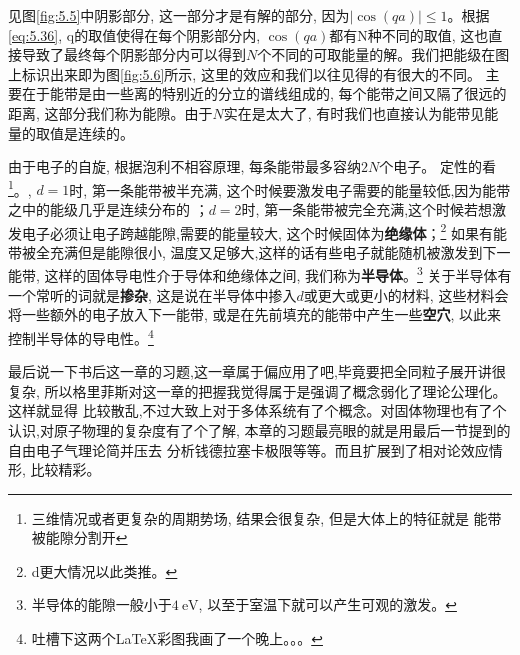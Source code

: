 见图\ref{fig:5.5}中阴影部分, 这一部分才是有解的部分, 因为$|\cos(qa)|\leq 1$。根据\ref{eq:5.36}, q的取值使得在每个阴影部分内, $\cos(qa)$都有N种不同的取值, 
这也直接导致了最终每个阴影部分内可以得到$N$个不同的可取能量的解。我们把能级在图上标识出来即为图\ref{fig:5.6}所示, 这里的效应和我们以往见得的有很大的不同。
主要在于能带是由一些离的特别近的分立的谱线组成的, 每个能带之间又隔了很远的距离, 这部分我们称为能隙。由于$N$实在是太大了, 有时我们也直接认为能带见能量的取值是连续的。

由于电子的自旋, 根据泡利不相容原理, 每条能带最多容纳$2N$个电子。 定性的看\footnote{三维情况或者更复杂的周期势场, 结果会很复杂, 但是大体上的特征就是
能带被能隙分割开}。, $d=1$时, 第一条能带被半充满, 这个时候要激发电子需要的能量较低,因为能带之中的能级几乎是连续分布的 ；$d=2$时, 第一条能带被完全充满,这个时候若想激发电子必须让电子跨越能隙,需要的能量较大, 这个时候固体为\textbf{绝缘体}；\footnote{d更大情况以此类推。}
如果有能带被全充满但是能隙很小, 温度又足够大,这样的话有些电子就能随机被激发到下一能带, 这样的固体导电性介于导体和绝缘体之间, 我们称为\textbf{半导体}。\footnote{半导体的能隙一般小于$\SI{4}{\eV}$, 以至于室温下就可以产生可观的激发。}
关于半导体有一个常听的词就是\textbf{掺杂}, 这是说在半导体中掺入$d$或更大或更小的材料, 这些材料会将一些额外的电子放入下一能带, 或是在先前填充的能带中产生一些\textbf{空穴}, 
以此来控制半导体的导电性。\footnote{吐槽下这两个\LaTeX 彩图我画了一个晚上。。。}

最后说一下书后这一章的习题,这一章属于偏应用了吧,毕竟要把全同粒子展开讲很复杂, 所以格里菲斯对这一章的把握我觉得属于是强调了概念弱化了理论公理化。这样就显得
比较散乱,不过大致上对于多体系统有了个概念。对固体物理也有了个认识,对原子物理的复杂度有了个了解, 本章的习题最亮眼的就是用最后一节提到的自由电子气理论简并压去
分析钱德拉塞卡极限等等。而且扩展到了相对论效应情形, 比较精彩。